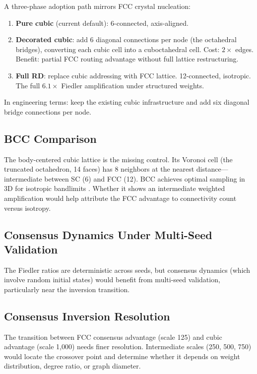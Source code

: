 \documentclass[11pt]{article}
\begin{document}
A three-phase adoption path mirrors FCC crystal nucleation:

\begin{enumerate}
  \item \textbf{Pure cubic} (current default): 6-connected, axis-aligned.
  \item \textbf{Decorated cubic}: add 6 diagonal connections per
    node (the octahedral bridges), converting each cubic cell into
    a cuboctahedral cell. Cost: $2\times$ edges. Benefit: partial
    FCC routing advantage without full lattice restructuring.
  \item \textbf{Full RD}: replace cubic addressing with FCC
    lattice. 12-connected, isotropic. The full $6.1\times$ Fiedler
    amplification under structured weights.
\end{enumerate}

In engineering terms: keep the existing cubic infrastructure and
add six diagonal bridge connections per node.

\subsection{BCC Comparison}

The body-centered cubic lattice is the missing control. Its Voronoi
cell (the truncated octahedron, 14 faces) has 8 neighbors at the
nearest distance---intermediate between SC (6) and FCC (12). BCC
achieves optimal sampling in 3D for isotropic bandlimits
\cite{petersen1962}. Whether it shows an intermediate weighted
amplification would help attribute the FCC advantage to connectivity
count versus isotropy.

\subsection{Consensus Dynamics Under Multi-Seed Validation}

The Fiedler ratios are deterministic across seeds, but consensus
dynamics (which involve random initial states) would benefit from
multi-seed validation, particularly near the inversion transition.

\subsection{Consensus Inversion Resolution}

The transition between FCC consensus advantage (scale 125) and
cubic advantage (scale 1{,}000) needs finer resolution. Intermediate
scales (250, 500, 750) would locate the crossover point and
determine whether it depends on weight distribution, degree ratio,
or graph diameter.
\end{document}
